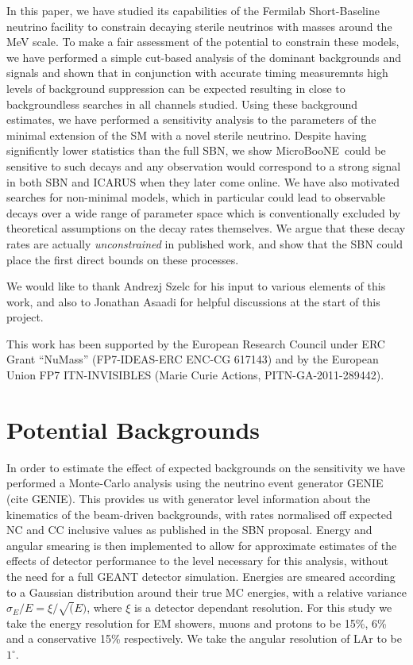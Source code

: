 \documentclass[11pt, a4paper]{article}
\def\muboone{MicroBooNE}
\begin{document}
In this paper, we have studied its capabilities of the Fermilab Short-Baseline
neutrino facility to constrain decaying sterile neutrinos with masses around
the MeV scale. To make a fair assessment of the potential to constrain these
models, we have performed a simple cut-based analysis of the dominant
backgrounds and signals and shown that in conjunction with accurate timing
measuremnts high levels of background suppression can be expected resulting in
close to backgroundless searches in all channels studied. Using these
background estimates, we have performed a sensitivity analysis to the
parameters of the minimal extension of the SM with a novel sterile neutrino.
Despite having significntly lower statistics than the full SBN, we show
\muboone\ could be sensitive to such decays and any observation would
correspond to a strong signal in both SBN and ICARUS when they later come
online.  We have also motivated searches for non-minimal models, which in
particular could lead to observable decays over a wide range of parameter space
which is conventionally excluded by theoretical assumptions on the decay rates
themselves. We argue that these decay rates are actually \emph{unconstrained}
in published work, and show that the SBN could place the first direct bounds on
these processes. 

\acknowledgments

We would like to thank Andrezj Szelc for his input to various elements of this
work, and also to Jonathan Asaadi for helpful discussions at the start of this
project.

This work has been supported by the European Research Council under ERC Grant
“NuMass” (FP7-IDEAS-ERC ENC-CG 617143) and by the European Union FP7
ITN-INVISIBLES (Marie Curie Actions, PITN-GA-2011-289442).

\appendix

\section{Potential Backgrounds\label{sec:bg}}

In order to estimate the effect of expected backgrounds on the sensitivity we
have performed a Monte-Carlo analysis using the neutrino event generator GENIE
(cite GENIE). This provides us with generator level information about the
kinematics of the beam-driven backgrounds, with rates normalised off expected
NC and CC inclusive values as published in the SBN proposal. Energy and angular
smearing is then implemented to allow for approximate estimates of the effects
of detector performance to the level necessary for this analysis, without the
need for a full GEANT detector simulation. Energies are smeared according to a
Gaussian distribution around their true MC energies, with a relative variance
$\sigma_E/E = \xi/ \sqrt(E) $, where $\xi$ is a detector dependant resolution.
For this study we take the energy resolution for EM showers, muons and protons
to be 15\%, 6\% and a conservative 15\% respectively. We take the angular
resolution of LAr to be $1^{\circ}$. 
\end{document}
